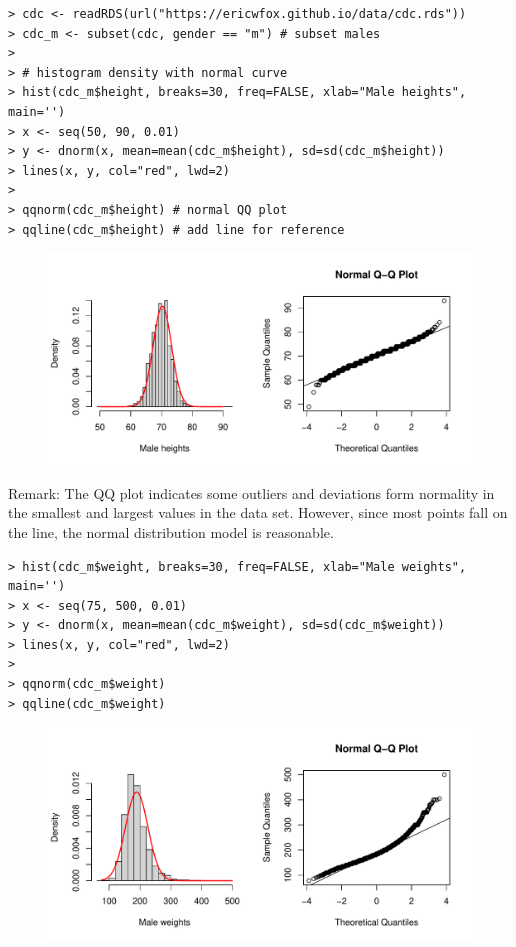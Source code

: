 \documentclass[10pt]{beamer}
\begin{document}
\begin{frame}[fragile]
\scriptsize
\begin{verbatim}
> cdc <- readRDS(url("https://ericwfox.github.io/data/cdc.rds"))
> cdc_m <- subset(cdc, gender == "m") # subset males
> 
> # histogram density with normal curve
> hist(cdc_m$height, breaks=30, freq=FALSE, xlab="Male heights", main='')
> x <- seq(50, 90, 0.01)
> y <- dnorm(x, mean=mean(cdc_m$height), sd=sd(cdc_m$height))
> lines(x, y, col="red", lwd=2) 
> 
> qqnorm(cdc_m$height) # normal QQ plot
> qqline(cdc_m$height) # add line for reference
\end{verbatim}

\begin{figure}[htbp]
\centering
\includegraphics[scale=0.4]{figure/dhist_qq_mht.pdf}
\end{figure}

\small
Remark: The QQ plot indicates some outliers and deviations form normality in the smallest and largest values in the data set.  However, since most points fall on the line, the normal distribution model is reasonable. 
\end{frame}


\begin{frame}[fragile]
\scriptsize
\begin{verbatim}
> hist(cdc_m$weight, breaks=30, freq=FALSE, xlab="Male weights", main='')
> x <- seq(75, 500, 0.01)
> y <- dnorm(x, mean=mean(cdc_m$weight), sd=sd(cdc_m$weight))
> lines(x, y, col="red", lwd=2)
> 
> qqnorm(cdc_m$weight)
> qqline(cdc_m$weight)
\end{verbatim}

\begin{figure}[htbp]
\centering
\includegraphics[scale=0.5]{figure/dhist_qq_mwt.pdf}
\end{figure}
\end{frame}
\end{document}
